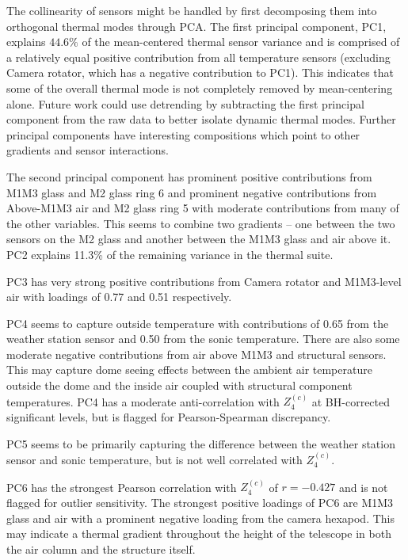 \documentclass[SE,authoryear,toc]{lsstdoc}
\begin{document}
The collinearity of sensors might be handled by first decomposing them into orthogonal thermal modes through PCA. The first principal component, PC1, explains $44.6\%$ of the mean-centered thermal sensor variance and is comprised of a relatively equal positive contribution from all temperature sensors (excluding Camera rotator, which has a negative contribution to PC1). This indicates that some of the overall thermal mode is not completely removed by mean-centering alone. Future work could use detrending by subtracting the first principal component from the raw data to better isolate dynamic thermal modes. Further principal components have interesting compositions which point to other gradients and sensor interactions. 

The second principal component has prominent positive contributions from M1M3 glass and M2 glass ring 6 and prominent negative contributions from Above-M1M3 air and M2 glass ring 5 with moderate contributions from many of the other variables. This seems to combine two gradients -- one between the two sensors on the M2 glass and another between the M1M3 glass and air above it. PC2 explains 11.3\% of the remaining variance in the thermal suite. 

PC3 has very strong positive contributions from Camera rotator and M1M3-level air with loadings of 0.77 and 0.51 respectively. 

PC4 seems to capture outside temperature with contributions of 0.65 from the weather station sensor and 0.50 from the sonic temperature. There are also some moderate negative contributions from air above M1M3 and structural sensors. This may capture dome seeing effects between the ambient air temperature outside the dome and the inside air coupled with structural component temperatures. PC4 has a moderate anti-correlation with $Z_4^{(c)}$ at BH-corrected significant levels, but is flagged for Pearson-Spearman discrepancy. 

PC5 seems to be primarily capturing the difference between the weather station sensor and sonic temperature, but is not well correlated with $Z_4^{(c)}$.

PC6 has the strongest Pearson correlation with $Z_4^{(c)}$ of $r = -0.427$ and is not flagged for outlier sensitivity. The strongest positive loadings of PC6 are M1M3 glass and air with a prominent negative loading from the camera hexapod. This may indicate a thermal gradient throughout the height of the telescope in both the air column and the structure itself. 
\end{document}
